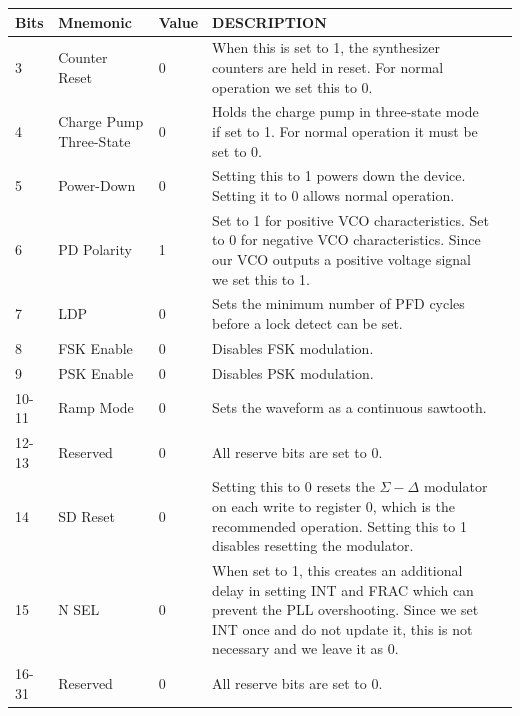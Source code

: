 \label{tab:adf4158-reg-map-3}
\begin{tabularx}{\textwidth}{l l l X>{\raggedright\arraybackslash}X}
  \caption{FUNCTION REGISTER(R3) MAP} \\
  \toprule
  \textbf{Bits} & \textbf{Mnemonic} & \textbf{Value} & \textbf{DESCRIPTION} \\
  \midrule

  \endhead{}

  3 & Counter Reset & 0 & When this is set to 1, the synthesizer counters are held in reset. For
                          normal operation we set this to 0. \\
  4 & Charge Pump Three-State & 0 & Holds the charge pump in three-state mode if set to 1. For
                                    normal operation it must be set to 0. \\
  5 & Power-Down & 0 & Setting this to 1 powers down the device. Setting it to 0 allows normal
                       operation. \\
  6 & PD Polarity & 1 & Set to 1 for positive VCO characteristics. Set to 0 for negative VCO
                        characteristics. Since our VCO outputs a positive voltage signal we set this
                        to 1. \\
  7 & LDP & 0 & Sets the minimum number of PFD cycles before a lock detect can be set. \\
  8 & FSK Enable & 0 & Disables FSK modulation. \\
  9 & PSK Enable & 0 & Disables PSK modulation. \\
  10-11 & Ramp Mode & 0 & Sets the waveform as a continuous sawtooth. \\
  12-13 & Reserved & 0 & All reserve bits are set to 0. \\
  14 & SD Reset & 0 & Setting this to 0 resets the $\Sigma-\Delta$ modulator on each write to
                      register 0, which is the recommended operation. Setting this to 1 disables
                      resetting the modulator. \\
  15 & N SEL & 0 & When set to 1, this creates an additional delay in setting INT and FRAC which can
                   prevent the PLL overshooting. Since we set INT once and do not update it, this is
                   not necessary and we leave it as 0. \\
  16-31 & Reserved & 0 & All reserve bits are set to 0. \\

  \bottomrule
\end{tabularx}

